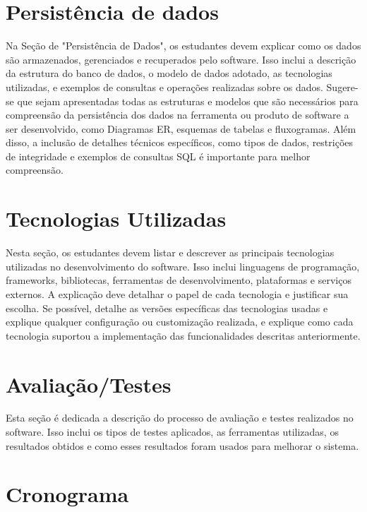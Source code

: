 \section{Persistência de dados}

Na Seção de "Persistência de Dados", os estudantes devem explicar como os dados são armazenados, gerenciados e recuperados pelo software. Isso inclui a descrição da estrutura do banco de dados, o modelo de dados adotado, as tecnologias utilizadas, e exemplos de consultas e operações realizadas sobre os dados. 
Sugere-se que sejam apresentadas todas as estruturas e modelos que são necessários para compreensão da persistência dos dados na ferramenta ou produto de software a ser desenvolvido, como Diagramas ER, esquemas de tabelas e fluxogramas. Além disso, a inclusão de detalhes técnicos específicos, como tipos de dados, restrições de integridade e exemplos de consultas SQL é importante para melhor compreensão. 


\section{Tecnologias Utilizadas}

Nesta seção, os estudantes devem listar e descrever as principais tecnologias utilizadas no desenvolvimento do software. Isso inclui linguagens de programação, frameworks, bibliotecas, ferramentas de desenvolvimento, plataformas e serviços externos. A explicação deve detalhar o papel de cada tecnologia e justificar sua escolha.
Se possível, detalhe as versões específicas das tecnologias usadas e explique qualquer configuração ou customização realizada, e explique como cada tecnologia suportou a implementação das funcionalidades descritas anteriormente. 

\section{Avaliação/Testes}

Esta seção é dedicada a descrição do processo de avaliação e testes realizados no software. Isso inclui os tipos de testes aplicados, as ferramentas utilizadas, os resultados obtidos e como esses resultados foram usados para melhorar o sistema.

\section{Cronograma}

